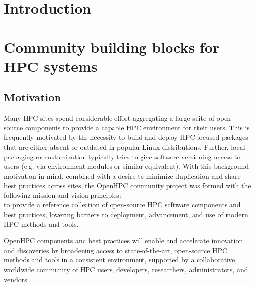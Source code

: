 \documentclass{sig-alternate-05-2015}
\begin{document}

%
%

%
%
\printccsdesc


\section{Introduction}


\section{Community building blocks for HPC systems}

\subsection{Motivation}
Many HPC sites spend considerable effort aggregating a large suite of
open-source components to provide a capable HPC environment for their users.
This is frequently motivated by the necessity to build and deploy HPC focused
packages that are either absent or outdated in popular Linux
distributions. Further, local packaging or customization typically tries to
give software versioning access to users (e.g. via environment modules or
similar equivalent).  With this background motivation in mind, combined with a
desire to minimize duplication and share best practices across sites, the OpenHPC community
project was formed with the following mission and vision principles: \\

 to
provide a reference collection of open-source HPC software components and
best practices, lowering barriers to deployment, advancement, and use of
modern HPC methods and tools.

 OpenHPC components and best practices will enable and
accelerate innovation and discoveries by broadening access to state-of-the-art,
open-source HPC methods and tools in a consistent environment, supported by a
collaborative, worldwide community of HPC users, developers, researchers,
administrators, and vendors. \\
\end{document}
